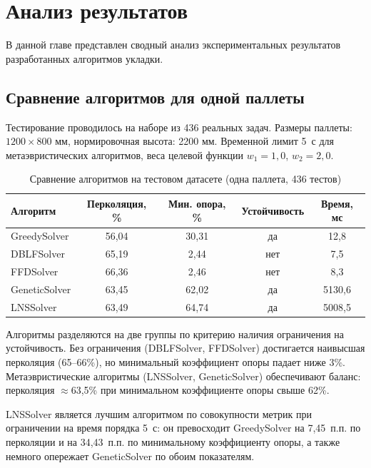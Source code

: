 \chapter{Анализ результатов}
\label{ch:6}

В данной главе представлен сводный анализ экспериментальных результатов разработанных алгоритмов укладки.

\section{Сравнение алгоритмов для одной паллеты}

Тестирование проводилось на наборе из 436 реальных задач. Размеры паллеты: $1200 \times 800$ мм, нормировочная высота: 2200 мм. Временной лимит 5~с для метаэвристических алгоритмов, веса целевой функции $w_1 = 1{,}0$, $w_2 = 2{,}0$.

\begin{table}[H]
    \caption{Сравнение алгоритмов на тестовом датасете (одна паллета, 436 тестов)}
    \centering
    \begin{tabular}{|l|c|c|c|c|}
    \hline
    \textbf{Алгоритм} & \textbf{Перколяция, \%} & \textbf{Мин. опора, \%} & \textbf{Устойчивость} & \textbf{Время, мс} \\
    \hline
    GreedySolver   & 56,04 & 30,31 & да  &    12,8 \\
    DBLFSolver     & 65,19 &  2,44 & нет &     7,5 \\
    FFDSolver      & 66,36 &  2,46 & нет &     8,3 \\
    GeneticSolver  & 63,45 & 62,02 & да  & 5130,6 \\
    LNSSolver      & 63,49 & 64,74 & да  & 5008,5 \\
    \hline
    \end{tabular}
    \label{tab:metrics_class}
\end{table}

Алгоритмы разделяются на две группы по критерию наличия ограничения на устойчивость. Без ограничения (DBLFSolver, FFDSolver) достигается наивысшая перколяция (65--66\%), но минимальный коэффициент опоры падает ниже 3\%. Метаэвристические алгоритмы (LNSSolver, GeneticSolver) обеспечивают баланс: перколяция $\approx$63,5\% при минимальном коэффициенте опоры свыше 62\%.

LNSSolver является лучшим алгоритмом по совокупности метрик при ограничении на время порядка 5~с: он превосходит GreedySolver на 7,45~п.п. по перколяции и на 34,43~п.п. по минимальному коэффициенту опоры, а также немного опережает GeneticSolver по обоим показателям.

